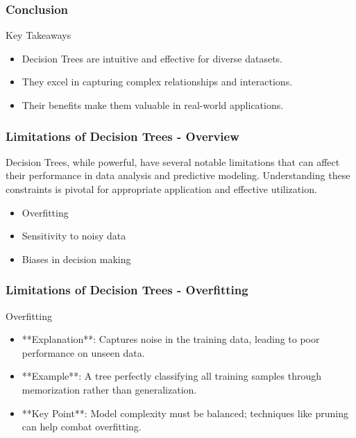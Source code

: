 \documentclass[aspectratio=169]{beamer}
\begin{document}
\begin{frame}[fragile]
    \frametitle{Conclusion}
    \begin{block}{Key Takeaways}
        \begin{itemize}
            \item Decision Trees are intuitive and effective for diverse datasets.
            \item They excel in capturing complex relationships and interactions.
            \item Their benefits make them valuable in real-world applications.
        \end{itemize}
    \end{block}
\end{frame}

\begin{frame}[fragile]
    \frametitle{Limitations of Decision Trees - Overview}
    Decision Trees, while powerful, have several notable limitations that can affect their performance in data analysis and predictive modeling. Understanding these constraints is pivotal for appropriate application and effective utilization.
    
    \begin{itemize}
        \item Overfitting
        \item Sensitivity to noisy data
        \item Biases in decision making
    \end{itemize}
\end{frame}

\begin{frame}[fragile]
    \frametitle{Limitations of Decision Trees - Overfitting}
    \begin{block}{Overfitting}
        \begin{itemize}
            \item **Explanation**: Captures noise in the training data, leading to poor performance on unseen data.
            \item **Example**: A tree perfectly classifying all training samples through memorization rather than generalization.
            \item **Key Point**: Model complexity must be balanced; techniques like pruning can help combat overfitting.
        \end{itemize}
    \end{block}
\end{frame}
\end{document}
